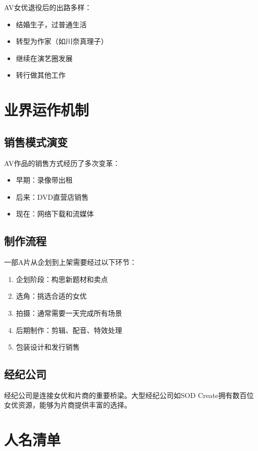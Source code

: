 \documentclass[12pt,UTF8]{ctexbook}
\begin{document}
AV女优退役后的出路多样：
\begin{itemize}
\item 结婚生子，过普通生活
\item 转型为作家（如川奈真理子）
\item 继续在演艺圈发展
\item 转行做其他工作
\end{itemize}

\chapter{业界运作机制}

\section{销售模式演变}

AV作品的销售方式经历了多次变革：
\begin{itemize}
\item 早期：录像带出租
\item 后来：DVD直营店销售
\item 现在：网络下载和流媒体
\end{itemize}

\section{制作流程}

一部A片从企划到上架需要经过以下环节：
\begin{enumerate}
\item 企划阶段：构思新题材和卖点
\item 选角：挑选合适的女优
\item 拍摄：通常需要一天完成所有场景
\item 后期制作：剪辑、配音、特效处理
\item 包装设计和发行销售
\end{enumerate}

\section{经纪公司}

经纪公司是连接女优和片商的重要桥梁。大型经纪公司如SOD Create拥有数百位女优资源，能够为片商提供丰富的选择。

\chapter{人名清单}
\end{document}
